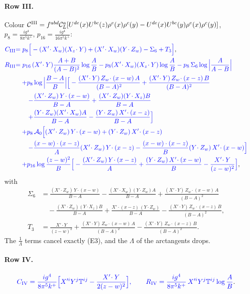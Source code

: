 \documentclass[10pt]{article}
\numberwithin{equation}{section}
\newcommand{\new}[1]{{\color{blue}#1}}
\newcommand{\CL}{\mathcal C_L}
\begin{document}
\paragraph{Row III.} Colour $\mathcal C^{\rm III}=f^{abd}\CL^a[U^{de}(x)U^{bc}(z)\rho^e(x)\rho^c(y)-U^{de}(x)U^{bc}(y)\rho^e(x)\rho^c(y)]$, $p_8=\frac{ig^4}{8\pi^5k^+}$, $p_{16}=\frac{ig^4}{16\pi^5k^+}$:
\begin{align*}
\new{C_{\rm III}}&\new{=p_8\Big[-(X'\!\cdot X_w)(X_z\!\cdot Y)+(X'\!\cdot X_w)(Y\!\cdot Z_w)-\Sigma_6+T_3\Big]},\\
\new{R_{\rm III}}&\new{=p_{16}\,(X'\!\cdot Y)\frac{A+B}{(A-B)^2}\log\frac AB-p_8(X'\!\cdot X_w)(X_z\!\cdot Y)\log\frac AB-p_8\,\Sigma_6\log\Big|\frac{A}{A-B}\Big|}\\
&\new{\quad+p_8\log\Big|\frac{B-A}{B}\Big|\Big[-\frac{(X'\!\cdot Y)\,Z_w\!\cdot(x-w)\,A}{(B-A)^2}+\frac{(X'\!\cdot Y)\,Z_w\!\cdot(x-z)\,B}{(B-A)^2}}\\&\new{\qquad-\frac{(X'\!\cdot Z_w)\,Y\!\cdot(x-w)}{B-A}+\frac{(X'\!\cdot Z_w)(Y\!\cdot X_z)B}{B-A}}\\
&\new{\qquad+\frac{(Y\!\cdot Z_w)(X'\!\cdot X_w)A}{B-A}-\frac{(Y\!\cdot Z_w)\,X'\!\cdot(x-z)}{B-A}\Big]}\\
&\new{\quad+p_8\,\mathcal A_0\Big[(X'\!\cdot Z_w)\,Y\!\cdot(x-w)+(Y\!\cdot Z_w)\,X'\!\cdot(x-z)}\\&\new{\qquad-\frac{(x-w)\cdot(x-z)}{A}(X'\!\cdot Z_w)\,Y\!\cdot(x-z)-\frac{(x-w)\cdot(x-z)}{B}(Y\!\cdot Z_w)\,X'\!\cdot(x-w)\Big]}\\
&\new{\quad+p_{16}\log\frac{(z-w)^2}{B}\Big[-\frac{(X'\!\cdot Z_w)\,Y\!\cdot(x-z)}{A}+\frac{(Y\!\cdot Z_w)\,X'\!\cdot(x-w)}{B}-\frac{X'\!\cdot Y}{(z-w)^2}\Big]},
\end{align*}
with
\begin{align*}
\Sigma_6&=\frac{(X'\!\cdot Z_w)\,Y\!\cdot(x-w)}{B-A}-\frac{(X'\!\cdot X_w)(Y\!\cdot Z_w)A}{B-A}+\frac{(X'\!\cdot Y)\,Z_w\!\cdot(x-w)\,A}{(B-A)^2}\\&\quad-\frac{(X'\!\cdot Z_w)(Y\!\cdot X_z)B}{B-A}+\frac{X'\!\cdot(x-z)\,(Y\!\cdot Z_w)}{B-A}-\frac{(X'\!\cdot Y)\,Z_w\!\cdot(x-z)\,B}{(B-A)^2},\\
T_3&=\frac{X'\!\cdot Y}{(z-w)^2}+\frac{(X'\!\cdot Y)\,Z_w\!\cdot(x-w)\,A}{(B-A)^2}-\frac{(X'\!\cdot Y)\,Z_w\!\cdot(x-z)\,B}{(B-A)^2}.
\end{align*}
The $\frac1\Lambda$ terms cancel exactly (E3), and the $\Lambda$ of the arctangents drops.
\paragraph{Row IV.}
\begin{equation*}
\new{C_{\rm IV}=\frac{ig^4}{8\pi^5k^+}\Big[X'^iY^j\mathbb T^{ij}-\frac{X'\!\cdot Y}{2(z-w)^2}\Big],\qquad R_{\rm IV}=\frac{ig^4}{8\pi^5k^+}\,X'^iY^j\mathbb T^{ij}\log\frac{A}{B}}.
\end{equation*}
\end{document}
